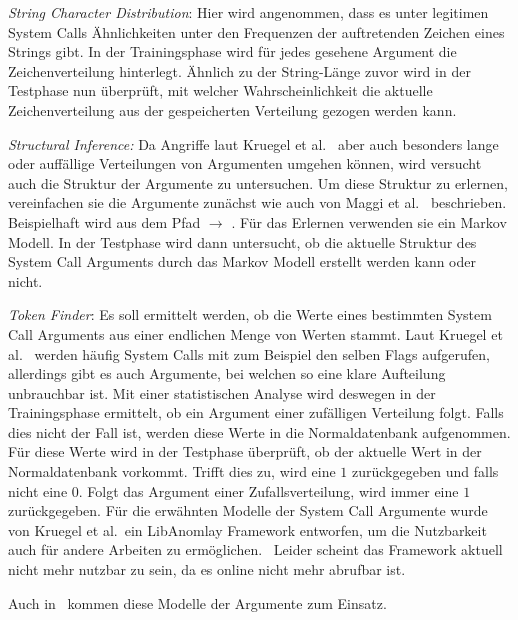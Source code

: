             \textit{String Character Distribution}: Hier wird angenommen, dass es unter legitimen System Calls Ähnlichkeiten unter den Frequenzen der auftretenden Zeichen eines Strings gibt.
            In der Trainingsphase wird für jedes gesehene Argument die Zeichenverteilung hinterlegt.
            Ähnlich zu der String-Länge zuvor wird in der Testphase nun überprüft, mit welcher Wahrscheinlichkeit die aktuelle Zeichenverteilung aus der gespeicherten Verteilung gezogen werden kann.

            \textit{Structural Inference:} Da Angriffe laut Kruegel et al.~\cite{ARGUMENTS} aber auch besonders lange oder auffällige Verteilungen von Argumenten umgehen können, wird versucht auch die Struktur der Argumente zu untersuchen.
            Um diese Struktur zu erlernen, vereinfachen sie die Argumente zunächst wie auch von Maggi et al.~\cite{ARGUMENTS2} beschrieben.
            Beispielhaft wird aus dem Pfad  $\longrightarrow$ .
            Für das Erlernen verwenden sie ein Markov Modell.
            In der Testphase wird dann untersucht, ob die aktuelle Struktur des System Call Arguments durch das Markov Modell erstellt werden kann oder nicht.

            \textit{Token Finder}: Es soll ermittelt werden, ob die Werte eines bestimmten System Call Arguments aus einer endlichen Menge von Werten stammt.
            Laut Kruegel et al.~\cite{ARGUMENTS} werden häufig System Calls mit zum Beispiel den selben Flags aufgerufen, allerdings gibt es auch Argumente, bei welchen so eine klare Aufteilung unbrauchbar ist.
            Mit einer statistischen Analyse wird deswegen in der Trainingsphase ermittelt, ob ein Argument einer zufälligen Verteilung folgt.
            Falls dies nicht der Fall ist, werden diese Werte in die Normaldatenbank aufgenommen.
            Für diese Werte wird in der Testphase überprüft, ob der aktuelle Wert in der Normaldatenbank vorkommt.
            Trifft dies zu, wird eine $1$ zurückgegeben und falls nicht eine $0$.
            Folgt das Argument einer Zufallsverteilung, wird immer eine $1$ zurückgegeben.
            Für die erwähnten Modelle der System Call Argumente wurde von Kruegel et al.\ ein LibAnomlay Framework entworfen, um die Nutzbarkeit auch für andere Arbeiten zu ermöglichen.~\cite{ARGUMENTS}
            Leider scheint das Framework aktuell nicht mehr nutzbar zu sein, da es online nicht mehr abrufbar ist.

            Auch in~\cite{ARGUMENTS2} kommen diese Modelle der Argumente zum Einsatz.
            
